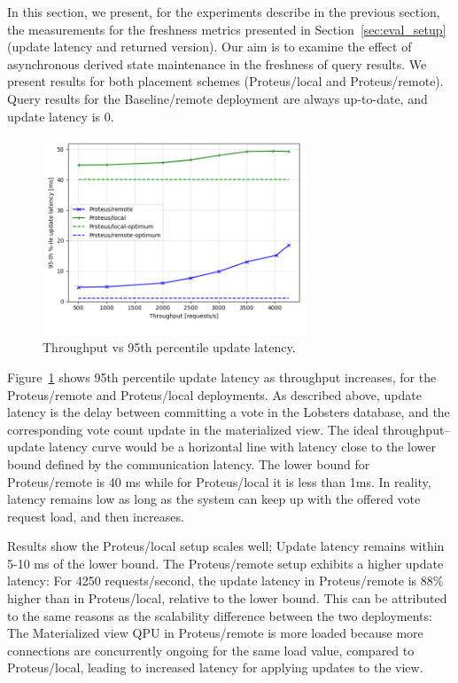 In this section, we present, for the experiments describe in the previous section,
the measurements for the freshness metrics presented in Section~\ref{sec:eval_setup} (update latency and returned version).
Our aim is to examine the effect of asynchronous derived state maintenance in the freshness of query results.
We present results for both placement schemes (Proteus/local and Proteus/remote).
Query results for the Baseline/remote deployment are always up-to-date,
and update latency is 0.


\begin{figure}[H]
\centering
  \includegraphics[width=0.7\textwidth]{./figures/evaluation/fr_latency_throughput.png}
  \caption{Throughput vs 95th percentile update latency.}
  \label{fig:fr_latency_throughput}
\end{figure}

Figure~\ref{fig:fr_latency_throughput} shows 95th percentile update latency as throughput increases,
for the Proteus/remote and Proteus/local deployments.
As described above, update latency is the delay between committing a vote in the Lobsters database,
and the corresponding vote count update in the materialized view.
The ideal throughput--update latency curve would be a horizontal line with latency close to the lower bound defined by
the communication latency.
The lower bound for Proteus/remote is 40 ms while for Proteus/local it is less than 1ms.
In reality, latency remains low as long as the system can keep up with the offered vote request load,
and then increases.

Results show the Proteus/local setup scales well; Update latency remains within 5-10 ms of the lower bound.
The Proteus/remote setup exhibits a higher update latency:
For 4250 requests/second, the update latency in Proteus/remote is 88\% higher than in Proteus/local,
relative to the lower bound.
This can be attributed to the same reasons as the scalability difference between the two deployments:
The Materialized view QPU in Proteus/remote is more loaded because more connections are concurrently ongoing
for the same load value, compared to Proteus/local,
leading to increased latency for applying updates to the view.

